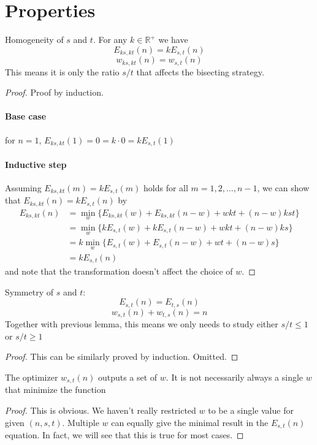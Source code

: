 \documentclass[]{article}
\begin{document}
\section{Properties}
\hspace{1cm}
\begin{lemma} Homogeneity of $s$ and $t$. For any $k\in\mathbb{R}^+$ we have
\[
	E_{ks,kt}(n) = k E_{s,t}(n)
\]
\[
	w_{ks,kt}(n) = w_{s,t}(n)
\]
This means it is only the ratio $s/t$ that affects the bisecting strategy.
\end{lemma}
\begin{proof}
		Proof by induction. 
	\paragraph{Base case} for $n = 1$, $E_{ks,kt}(1) = 0 = k\cdot0 = kE_{s,t}(1)$
	\paragraph{Inductive step} Assuming $E_{ks,kt}(m) = k E_{s,t}(m)$ holds for all $m = 1,2,\dots,n-1$, we can show that $E_{ks,kt}(n) = k E_{s,t}(n)$ by 
	\begin{align*}
	E_{ks,kt}(n) &= \min_{w}\{E_{ks,kt}(w) + E_{ks,kt}(n-w) + wkt +(n-w)kst\}\\
	  &= \min_{w}\{k E_{s,t}(w) + k E_{s,t}(n-w) + wkt +(n-w)ks\}\\
	  &= k\min_{w}\{E_{s,t}(w) + E_{s,t}(n-w) + wt +(n-w)s\}\\
	  &=kE_{s,t}(n)
	\end{align*}
	and note that the transformation doesn't affect the choice of $w$.
\end{proof}	

\hspace{1cm}
\begin{lemma} Symmetry of $s$ and $t$:
	\[
		E_{s,t}(n) = E_{t,s}(n)
	\]
	\[
		w_{s,t}(n) + w_{t,s}(n) = n
	\]
Together with previous lemma, this means we only needs to study either $s/t \le1$ or $s/t \ge 1$
\end{lemma}
\begin{proof}
	This can be similarly proved by induction. Omitted.
\end{proof}	

\hspace{1cm}
\begin{lemma}
	The optimizer $w_{s,t}(n)$ outputs a set of $w$. It is not necessarily always a single $w$ that minimize the function
\end{lemma}
\begin{proof}
		This is obvious. We haven't really restricted $w$ to be a single value for given $(n,s,t)$. Multiple $w$ can equally give the minimal result in the $E_{s,t}(n)$ equation. In fact, we will see that this is true for most cases. 
\end{proof}	
\end{document}
